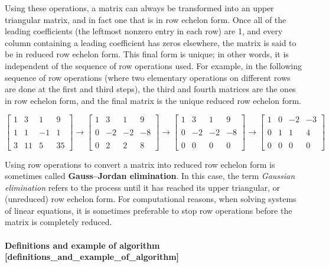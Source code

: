 {{{{{{{{{{{{{{{{Using these operations, a matrix can always be transformed into an upper
triangular matrix, and in fact one that is in row echelon form. Once all
of the leading coefficients (the leftmost nonzero entry in each row) are
1, and every column containing a leading coefficient has zeros
elsewhere, the matrix is said to be in reduced row echelon form. This
final form is unique; in other words, it is independent of the sequence
of row operations used. For example, in the following sequence of row
operations (where two elementary operations on different rows are done
at the first and third steps), the third and fourth matrices are the
ones in row echelon form, and the final matrix is the unique reduced row
echelon form.

$$\begin{bmatrix}
1 & 3 & 1 & 9 \\\\
1 & 1 & -1 & 1 \\\\
3 & 11 & 5 & 35
\end{bmatrix}\to
\begin{bmatrix}
1 & 3 & 1 & 9 \\\\
0 & -2 & -2 & -8 \\\\
0 & 2 & 2 & 8
\end{bmatrix}\to
\begin{bmatrix}
1 & 3 & 1 & 9 \\\\
0 & -2 & -2 & -8 \\\\
0 & 0 & 0 & 0
\end{bmatrix}\to
\begin{bmatrix}
1 & 0 & -2 & -3 \\\\
0 & 1 & 1 & 4 \\\\
0 & 0 & 0 & 0
\end{bmatrix}$$

Using row operations to convert a matrix into reduced row echelon form
is sometimes called \textbf{Gauss–Jordan elimination}. In this case, the term
\textit{Gaussian elimination} refers to the process until it has reached its
upper triangular, or (unreduced) row echelon form. For computational
reasons, when solving systems of linear equations, it is sometimes
preferable to stop row operations before the matrix is completely
reduced.

\paragraph{Definitions and example of algorithm [definitions_and_example_of_algorithm]}

}}}}}}}}}}}}}}}}
